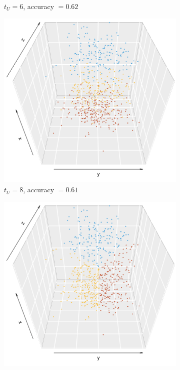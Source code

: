 \documentclass[10pt,journal,compsoc]{IEEEtran}
\numberwithin{equation}{section}
\begin{document}
\begin{figure}
\begin{subfigure}{.24\columnwidth}
\caption{$t_U = 6$, accuracy $=0.62$}
\label{12:3}
\end{subfigure}
\begin{subfigure}{.24\columnwidth}
\includegraphics[width=\columnwidth]{real_8_d}%
\caption{$t_U = 8$, accuracy $=0.61$}
\end{subfigure}
\begin{subfigure}{.24\columnwidth}
\includegraphics[width=\columnwidth]{real_8_kmeans_d}%

\end{subfigure}
\end{figure}
\end{document}
